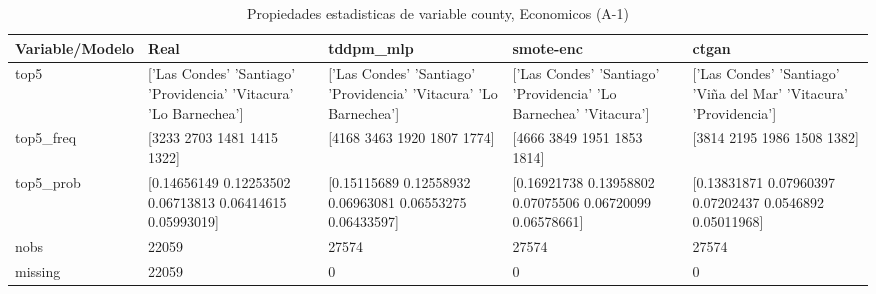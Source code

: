\begin{table}[H]
\centering
\fontsize{8}{14}\selectfont
\caption{Propiedades  estadisticas de variable county, Economicos (A-1)}
\label{table-stats-economicos-a-1-county}
\begin{tabular}{|l|m{10em}|m{10em}|m{10em}|m{10em}|}
\hline
 \rowcolor[gray]{0.8}
Variable/Modelo & Real & tddpm\_mlp & smote-enc & ctgan \\
\hline top5 & ['Las Condes' 'Santiago' 'Providencia' 'Vitacura' 'Lo Barnechea'] & ['Las Condes' 'Santiago' 'Providencia' 'Vitacura' 'Lo Barnechea'] & ['Las Condes' 'Santiago' 'Providencia' 'Lo Barnechea' 'Vitacura'] & ['Las Condes' 'Santiago' 'Viña del Mar' 'Vitacura' 'Providencia'] \\
\hline top5\_freq & [3233 2703 1481 1415 1322] & [4168 3463 1920 1807 1774] & [4666 3849 1951 1853 1814] & [3814 2195 1986 1508 1382] \\
\hline top5\_prob & [0.14656149 0.12253502 0.06713813 0.06414615 0.05993019] & [0.15115689 0.12558932 0.06963081 0.06553275 0.06433597] & [0.16921738 0.13958802 0.07075506 0.06720099 0.06578661] & [0.13831871 0.07960397 0.07202437 0.0546892  0.05011968] \\
\hline nobs & 22059 & 27574 & 27574 & 27574 \\
\hline missing & 22059 & 0 & 0 & 0 \\
\hline
\end{tabular}
\end{table}
